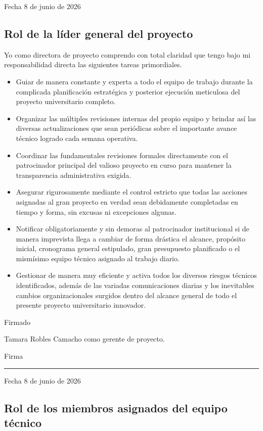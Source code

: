 \documentclass[11pt,spanish]{article}
\begin{document}
Fecha 8 de junio de 2026

\subsection{Rol de la líder general del proyecto}

Yo como directora de proyecto comprendo con total claridad que tengo bajo mi responsabilidad directa las siguientes tareas primordiales.

\begin{itemize}
    \item Guiar de manera constante y experta a todo el equipo de trabajo durante la complicada planificación estratégica y posterior ejecución meticulosa del proyecto universitario completo.
    \item Organizar las múltiples revisiones internas del propio equipo y brindar así las diversas actualizaciones que sean periódicas sobre el importante avance técnico logrado cada semana operativa.
    \item Coordinar las fundamentales revisiones formales directamente con el patrocinador principal del valioso proyecto en curso para mantener la transparencia administrativa exigida.
    \item Asegurar rigurosamente mediante el control estricto que todas las acciones asignadas al gran proyecto en verdad sean debidamente completadas en tiempo y forma, sin excusas ni excepciones algunas.
    \item Notificar obligatoriamente y sin demoras al patrocinador institucional si de manera imprevista llega a cambiar de forma drástica el alcance, propósito inicial, cronograma general estipulado, gran presupuesto planificado o el mismísimo equipo técnico asignado al trabajo diario.
    \item Gestionar de manera muy eficiente y activa todos los diversos riesgos técnicos identificados, además de las variadas comunicaciones diarias y los inevitables cambios organizacionales surgidos dentro del alcance general de todo el presente proyecto universitario innovador.
\end{itemize}

Firmado

Tamara Robles Camacho como gerente de proyecto.

Firma \rule{7cm}{0.4pt}

Fecha 8 de junio de 2026

\subsection{Rol de los miembros asignados del equipo técnico}
\end{document}
